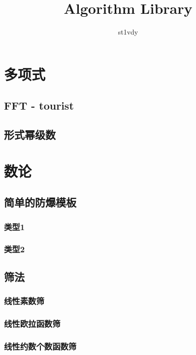 \documentclass{article}
\title{Algorithm Library}
\author{st1vdy}
\begin{document}
\begin{titlepage}
\maketitle
\thispagestyle{empty}
\pagebreak
\pagestyle{plain}
\tableofcontents
\end{titlepage}
\newpage %
\section{多项式} %
\subsection{FFT - tourist}

\subsection{形式幂级数}


\section{数论}
\subsection{简单的防爆模板}
\subsubsection{类型1}

\subsubsection{类型2}

\subsection{筛法}
\subsubsection{线性素数筛}

\subsubsection{线性欧拉函数筛}

\subsubsection{线性约数个数函数筛}

\end{document}
